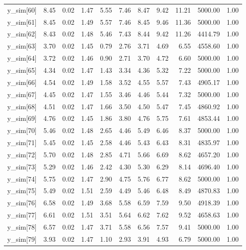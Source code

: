 \begin{table}[ht]
\begin{tabular}{rrrrrrrrrrr}
  y\_sim[60] & 8.45 & 0.02 & 1.47 & 5.55 & 7.46 & 8.47 & 9.42 & 11.21 & 5000.00 & 1.00 \\ 
  y\_sim[61] & 8.45 & 0.02 & 1.49 & 5.57 & 7.46 & 8.45 & 9.46 & 11.36 & 5000.00 & 1.00 \\ 
  y\_sim[62] & 8.43 & 0.02 & 1.48 & 5.46 & 7.43 & 8.44 & 9.42 & 11.26 & 4414.79 & 1.00 \\ 
  y\_sim[63] & 3.70 & 0.02 & 1.45 & 0.79 & 2.76 & 3.71 & 4.69 & 6.55 & 4558.60 & 1.00 \\ 
  y\_sim[64] & 3.72 & 0.02 & 1.46 & 0.90 & 2.71 & 3.70 & 4.72 & 6.60 & 5000.00 & 1.00 \\ 
  y\_sim[65] & 4.34 & 0.02 & 1.47 & 1.43 & 3.34 & 4.36 & 5.32 & 7.22 & 5000.00 & 1.00 \\ 
  y\_sim[66] & 4.54 & 0.02 & 1.49 & 1.58 & 3.52 & 4.55 & 5.57 & 7.43 & 4905.17 & 1.00 \\ 
  y\_sim[67] & 4.45 & 0.02 & 1.47 & 1.55 & 3.46 & 4.46 & 5.44 & 7.32 & 5000.00 & 1.00 \\ 
  y\_sim[68] & 4.51 & 0.02 & 1.47 & 1.66 & 3.50 & 4.50 & 5.47 & 7.45 & 4860.92 & 1.00 \\ 
  y\_sim[69] & 4.76 & 0.02 & 1.45 & 1.86 & 3.80 & 4.76 & 5.75 & 7.61 & 4853.44 & 1.00 \\ 
  y\_sim[70] & 5.46 & 0.02 & 1.48 & 2.65 & 4.46 & 5.49 & 6.46 & 8.37 & 5000.00 & 1.00 \\ 
  y\_sim[71] & 5.45 & 0.02 & 1.45 & 2.58 & 4.46 & 5.43 & 6.43 & 8.31 & 4835.97 & 1.00 \\ 
  y\_sim[72] & 5.70 & 0.02 & 1.48 & 2.85 & 4.71 & 5.66 & 6.69 & 8.62 & 4657.20 & 1.00 \\ 
  y\_sim[73] & 5.29 & 0.02 & 1.46 & 2.42 & 4.30 & 5.30 & 6.29 & 8.14 & 4696.40 & 1.00 \\ 
  y\_sim[74] & 5.75 & 0.02 & 1.47 & 2.90 & 4.75 & 5.76 & 6.77 & 8.62 & 5000.00 & 1.00 \\ 
  y\_sim[75] & 5.49 & 0.02 & 1.51 & 2.59 & 4.49 & 5.46 & 6.48 & 8.49 & 4870.83 & 1.00 \\ 
  y\_sim[76] & 6.58 & 0.02 & 1.49 & 3.68 & 5.58 & 6.59 & 7.59 & 9.50 & 4918.39 & 1.00 \\ 
  y\_sim[77] & 6.61 & 0.02 & 1.51 & 3.51 & 5.64 & 6.62 & 7.62 & 9.52 & 4658.63 & 1.00 \\ 
  y\_sim[78] & 6.57 & 0.02 & 1.47 & 3.71 & 5.58 & 6.56 & 7.57 & 9.41 & 5000.00 & 1.00 \\ 
  y\_sim[79] & 3.93 & 0.02 & 1.47 & 1.10 & 2.93 & 3.91 & 4.93 & 6.79 & 5000.00 & 1.00 \\ 

\end{tabular}
\end{table}
